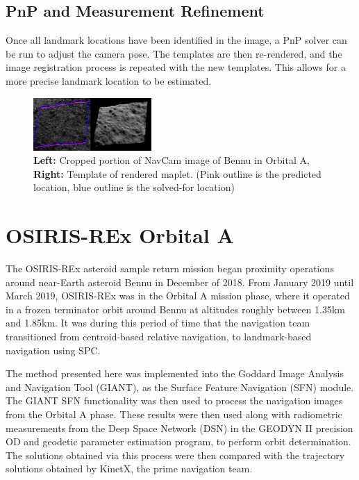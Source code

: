 \documentclass{src/RPI-SIW}
\begin{document}
\subsection*{PnP and Measurement Refinement}
Once all landmark locations have been identified in the image, a PnP solver can be run to adjust the camera pose.  The templates are then re-rendered, and the image registration process is repeated with the new templates.  This allows for a more precise landmark location to be estimated.

\begin{figure}[h]
	\centering
	\includegraphics[width=0.4\textwidth]{figs/sfn_sample.png}
	\caption{\textbf{Left:} Cropped portion of NavCam image of Bennu in Orbital A, \textbf{Right:} Template of rendered maplet.  (Pink outline is the predicted location, blue outline is the solved-for location)}
	\label{figs::samplefit}
\end{figure}


\section*{OSIRIS-REx Orbital A}
The OSIRIS-REx asteroid sample return mission began proximity operations around near-Earth asteroid Bennu in December of 2018.  From January 2019 until March 2019, OSIRIS-REx was in the Orbital A mission phase, where it operated in a frozen terminator orbit around Bennu at altitudes roughly between 1.35km and 1.85km.  It was during this period of time that the navigation team transitioned from centroid-based relative navigation, to landmark-based navigation using SPC.

The method presented here was implemented into the Goddard Image Analysis and Navigation Tool (GIANT)\cite{andrew}, as the Surface Feature Navigation (SFN) module.  The GIANT SFN functionality was then used to process the navigation images from the Orbital A phase.  These results were then used along with radiometric measurements from the Deep Space Network (DSN) in the GEODYN II precision OD and geodetic parameter estimation program, to perform orbit determination.  The solutions obtained via this process were then compared with the trajectory solutions obtained by KinetX, the prime navigation team. 
\end{document}
